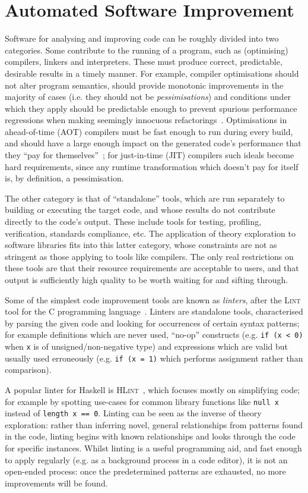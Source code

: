 \section{Automated Software Improvement}

Software for analysing and improving code can be roughly divided into two
categories. Some contribute to the running of a program, such as (optimising)
compilers, linkers and interpreters. These must produce correct, predictable,
desirable results in a timely manner. For example, compiler optimisations should
not alter program semantics, should provide monotonic improvements in the
majority of cases (i.e. they should not be \emph{pessimisations}) and conditions
under which they apply should be predictable enough to prevent spurious
performance regressions when making seemingly innocuous
refactorings~\cite{robison2001impact}. Optimisations in ahead-of-time (AOT)
compilers must be fast enough to run during every build, and should have a large
enough impact on the generated code's performance that they
``pay for themselves''~\cite{Franz1994}; for just-in-time (JIT) compilers such
ideals become hard requirements, since any runtime transformation which doesn't
pay for itself is, by definition, a pessimisation.

The other category is that of ``standalone'' tools, which are run separately to
building or executing the target code, and whose results do not contribute
directly to the code's output. These include tools for testing, profiling,
verification, standards compliance, etc. The application of theory exploration
to software libraries fits into this latter category, whose constraints are not
as stringent as those applying to tools like compilers. The only real
restrictions on these tools are that their resource requirements are acceptable
to users, and that output is sufficiently high quality to be worth waiting for
and sifting through.

Some of the simplest code improvement tools are known as \emph{linters}, after
the \textsc{Lint} tool for the C programming language~\cite{Johnson78lint}.
Linters are standalone tools, characterised by parsing the given code and
looking for occurrences of certain syntax patterns; for example definitions
which are never used, ``no-op'' constructs (e.g. \texttt{if~(x~<~0)} when
\texttt{x} is of unsigned/non-negative type) and expressions which are valid but
usually used erroneously (e.g. \texttt{if (x = 1)} which performs assignment
rather than comparison).

A popular linter for Haskell is \textsc{HLint}~\cite{mitchell2014hlint}, which
focuses mostly on simplifying code; for example by spotting use-cases for common
library functions like \texttt{null x} instead of \texttt{length x == 0}.
Linting can be seen as the inverse of theory exploration: rather than inferring
novel, general relationships from patterns found in the code, linting begins
with known relationships and looks through the code for specific instances.
Whilst linting is a useful programming aid, and fast enough to apply regularly
(e.g. as a background process in a code editor), it is not an open-ended
process: once the predetermined patterns are exhausted, no more improvements
will be found.


